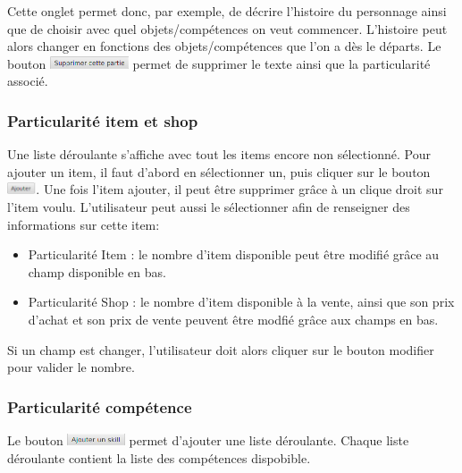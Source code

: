 			Cette onglet permet donc, par exemple, de décrire l'histoire du personnage ainsi que de choisir avec quel objets/compétences on veut commencer. L'histoire peut alors changer en fonctions des objets/compétences que l'on a dès le départs.
			Le bouton \includegraphics[height=10pt]{img/preludeSupprimerBouton.png} permet de supprimer le texte ainsi que la particularité associé.

			\subsubsection{Particularité item et shop} \label{subsubsection:Item/Shop}
				Une liste déroulante s'affiche avec tout les items encore non sélectionné. Pour ajouter un item, il faut d'abord en sélectionner un, puis cliquer sur le bouton \includegraphics[height=10pt]{img/ajouterBouton.png}. Une fois l'item ajouter, il peut être supprimer grâce à un clique droit sur l'item voulu.
				L'utilisateur peut aussi le sélectionner afin de renseigner des informations sur cette item:
				\begin{itemize}
					\item Particularité Item : le nombre d'item disponible peut être modifié grâce au champ disponible en bas.
					\item Particularité Shop : le nombre d'item disponible à la vente, ainsi que son prix d'achat et son prix de vente peuvent être modfié grâce aux champs en bas.
				\end{itemize}
				Si un champ est changer, l'utilisateur doit alors cliquer sur le bouton modifier pour valider le nombre.

			\subsubsection{Particularité compétence} \label{subsubsection:compétences}
				Le bouton \includegraphics[height=10pt]{img/preludeAjouterSkillBouton.png} permet d'ajouter une liste déroulante. Chaque liste déroulante contient la liste des compétences dispobible.

